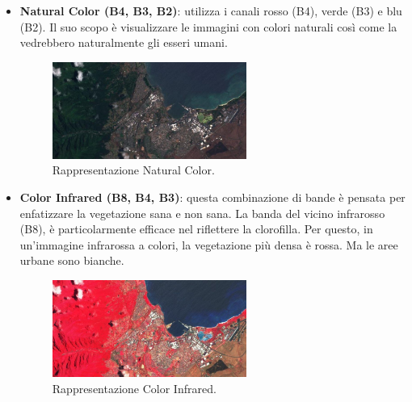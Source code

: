 \begin{itemize}
    \item \textbf{Natural Color (B4, B3, B2)}: utilizza i canali 
    rosso (B4), verde (B3) e blu (B2). Il suo scopo è visualizzare le immagini 
    con colori naturali così come la vedrebbero 
    naturalmente gli esseri umani.

    \begin{figure}[H]
        \centering
        \includegraphics[width=0.6\textwidth]{Immagini/Satelliti/Sentinel-2-Natural-Color-850x425.jpg}
        \caption{Rappresentazione Natural Color.}
    \end{figure}

    \item \textbf{Color Infrared (B8, B4, B3)}: questa combinazione di bande è 
    pensata per enfatizzare la vegetazione sana e non sana. 
    La banda del vicino infrarosso (B8), è particolarmente efficace nel 
    riflettere la clorofilla. Per questo, in un'immagine infrarossa a colori, 
    la vegetazione più densa è rossa. Ma le aree urbane sono bianche.
    
    \begin{figure}[H]
        \centering
        \includegraphics[width=0.6\textwidth]{Immagini/Satelliti/Sentinel-2-Color-Infrared.jpg}
        \caption{Rappresentazione Color Infrared.}
    \end{figure}
    

\end{itemize}
